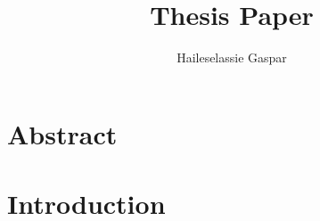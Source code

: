 \documentclass[12pt]{article}
\title{Thesis Paper}
\author{Haileselassie Gaspar}
\begin{document}
\maketitle
\section{Abstract}
\section{Introduction}
\end{document}

